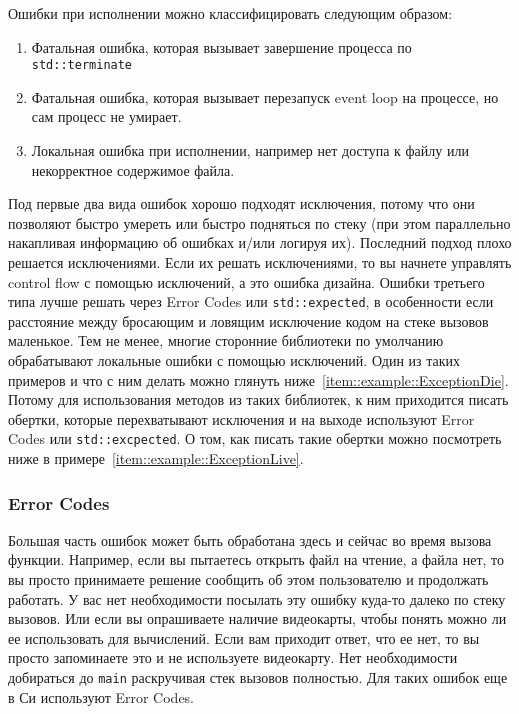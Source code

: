 Ошибки при исполнении можно классифицировать следующим образом:
\begin{enumerate}
\item Фатальная ошибка, которая вызывает завершение процесса по \verb"std::terminate"

\item Фатальная ошибка, которая вызывает перезапуск event loop на процессе, но сам процесс не умирает.

\item Локальная ошибка при исполнении, например нет доступа к файлу или некорректное содержимое файла.
\end{enumerate}
Под первые два вида ошибок хорошо подходят исключения, потому что они позволяют быстро умереть или быстро подняться по стеку (при этом параллельно накапливая информацию об ошибках и/или логируя их).
Последний подход плохо решается исключениями.
Если их решать исключениями, то вы начнете управлять control flow с помощью исключений, а это ошибка дизайна.
Ошибки третьего типа лучше решать через Error Codes или \verb"std::expected", в особенности если расстояние между бросающим и ловящим исключение кодом на стеке вызовов маленькое.
Тем не менее, многие сторонние библиотеки по умолчанию обрабатывают локальные ошибки с помощью исключений.
Один из таких примеров и что с ним делать можно глянуть ниже~\ref{item::example::ExceptionDie}.
Потому для использования методов из таких библиотек, к ним приходится писать обертки, которые перехватывают исключения и на выходе используют Error Codes или \verb"std::excpected".
О том, как писать такие обертки можно посмотреть ниже в примере~\ref{item::example::ExceptionLive}.

\subsubsection{Error Codes}

Большая часть ошибок может быть обработана здесь и сейчас во время вызова функции.
Например, если вы пытаетесь открыть файл на чтение, а файла нет, то вы просто принимаете решение сообщить об этом пользователю и продолжать работать.
У вас нет необходимости посылать эту ошибку куда-то далеко по стеку вызовов.
Или если вы опрашиваете наличие видеокарты, чтобы понять можно ли ее использовать для вычислений.
Если вам приходит ответ, что ее нет, то вы просто запоминаете это и не используете видеокарту.
Нет необходимости добираться до \verb"main" раскручивая стек вызовов полностью.
Для таких ошибок еще в Си используют Error Codes.

